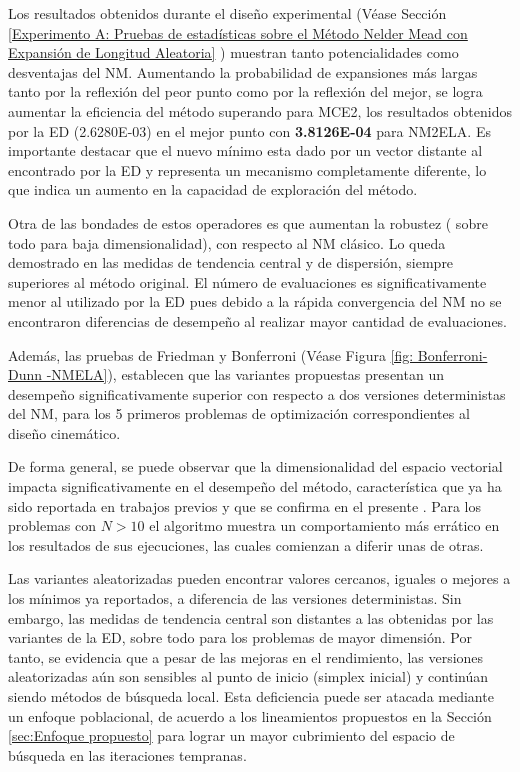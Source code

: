 Los resultados obtenidos durante el diseño experimental (Véase Sección \ref{Experimento A: Pruebas de estadísticas sobre el Método Nelder Mead con Expansión de Longitud Aleatoria} ) muestran tanto potencialidades como desventajas del NM. Aumentando la probabilidad de expansiones más largas tanto por la reflexión del peor punto como por la reflexión del mejor, se logra aumentar la eficiencia del método superando para MCE2, los resultados obtenidos por la ED (2.6280E-03) en el mejor punto con \textbf{3.8126E-04} para NM2ELA. Es importante destacar que el nuevo mínimo esta dado por un vector distante al encontrado por la ED y representa un mecanismo completamente diferente, lo que indica un aumento en la capacidad de exploración del método. 

Otra de las bondades de estos operadores es que aumentan la robustez ( sobre todo para baja dimensionalidad), con respecto al NM clásico.  Lo queda demostrado en las medidas de tendencia central y de dispersión, siempre superiores al método original. El número de evaluaciones es significativamente menor al utilizado por la ED pues debido a la rápida convergencia del NM no se encontraron diferencias de desempeño al realizar mayor cantidad de evaluaciones. 

Además, las pruebas de Friedman y Bonferroni (Véase Figura \ref{fig: Bonferroni-Dunn -NMELA}), establecen que  las variantes propuestas presentan un desempeño significativamente superior con respecto a dos versiones deterministas del NM, para los 5 primeros problemas de optimización correspondientes al diseño cinemático.

De forma general, se puede observar que la dimensionalidad del espacio vectorial impacta significativamente en el desempeño del método, característica que ya ha sido reportada en trabajos previos y que se confirma en el presente \cite{han_effect_2006}. Para los problemas con $N>10$ el algoritmo muestra un comportamiento más errático en los resultados de sus ejecuciones, las cuales comienzan a diferir unas de otras. 

 Las variantes aleatorizadas pueden encontrar valores cercanos, iguales o mejores a los mínimos ya reportados, a diferencia  de las versiones deterministas. Sin embargo, las medidas de tendencia central son distantes a las obtenidas por las variantes de la ED, sobre todo para los problemas de mayor dimensión. Por tanto, se evidencia que a pesar de las mejoras en el rendimiento, las versiones aleatorizadas aún son sensibles al punto de inicio (simplex inicial) y continúan siendo métodos de búsqueda local. Esta deficiencia puede ser atacada mediante un enfoque poblacional, de acuerdo a los lineamientos propuestos en la Sección \ref{sec:Enfoque propuesto} para lograr un mayor cubrimiento del espacio de búsqueda en las iteraciones tempranas.

